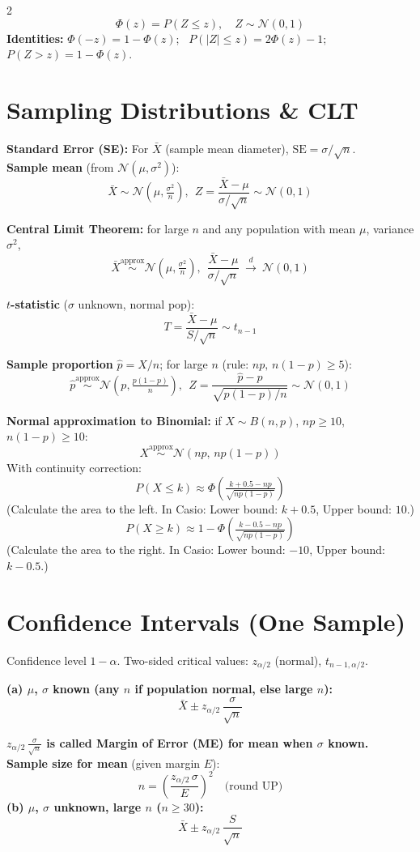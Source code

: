 \documentclass[9pt,a4paper]{extarticle}
\newcommand{\sh}[1]{\textbf{\color{BrickRed} #1}}
\begin{document}
\begin{multicols*}{2}
\[
\Phi(z) = P(Z \le z), \quad Z \sim \mathcal{N}(0,1)
\]
\sh{Identities:} $\Phi(-z)=1-\Phi(z)$; \ $P(|Z|\le z)=2\Phi(z)-1$; \ $P(Z>z)=1-\Phi(z)$.

\section{Sampling Distributions \& CLT}
\sh{Standard Error (SE):} For $\bar{X}$ (sample mean diameter), $\text{SE} = \sigma/\sqrt{n}$.\\
\sh{Sample mean} (from $\mathcal{N}(\mu,\sigma^{2})$):
\[
\bar{X}\sim \mathcal{N}\!\left(\mu,\tfrac{\sigma^{2}}{n}\right),\ \
Z=\frac{\bar{X}-\mu}{\sigma/\sqrt{n}}\sim\mathcal{N}(0,1)
\]

\sh{Central Limit Theorem:} for large $n$ and any population with mean $\mu$, variance $\sigma^{2}$,
\[
\bar{X}\overset{\text{approx}}{\sim}\mathcal{N}\!\left(\mu,\tfrac{\sigma^{2}}{n}\right),\ \
\frac{\bar{X}-\mu}{\sigma/\sqrt{n}}\ \xrightarrow{d}\ \mathcal{N}(0,1)
\]

\sh{$t$-statistic} ($\sigma$ unknown, normal pop):
\[
T=\frac{\bar{X}-\mu}{S/\sqrt{n}}\sim t_{n-1}
\]

\sh{Sample proportion} $\hat{p}=X/n$; for large $n$ (rule: $np,\,n(1-p)\ge 5$):
\[
\hat{p}\overset{\text{approx}}{\sim}\mathcal{N}\!\left(p,\tfrac{p(1-p)}{n}\right),\ \
Z=\frac{\hat{p}-p}{\sqrt{p(1-p)/n}}\sim\mathcal{N}(0,1)
\]

\sh{Normal approximation to Binomial:} if $X\sim B(n,p)$, $np\ge 10$, $n(1-p)\ge 10$:
\[
X\overset{\text{approx}}{\sim}\mathcal{N}\!\left(np,\,np(1-p)\right)
\]
With continuity correction:
\[
P(X\le k)\approx \Phi\!\left(\tfrac{k+0.5-np}{\sqrt{np(1-p)}}\right)
\]
(Calculate the area to the left. In Casio: Lower bound: $k+0.5$, Upper bound: $10$.)\\
\[
P(X\ge k)\approx 1-\Phi\!\left(\tfrac{k-0.5-np}{\sqrt{np(1-p)}}\right)
\]
(Calculate the area to the right. In Casio: Lower bound: $-10$, Upper bound: $k-0.5$.)
\section{Confidence Intervals (One Sample)}

Confidence level $1-\alpha$. Two-sided critical values: $z_{\alpha/2}$ (normal), $t_{n-1,\alpha/2}$.

\sh{(a) $\mu$, $\sigma$ known (any $n$ if population normal, else large $n$):}
\[
\bar{X}\pm z_{\alpha/2}\,\frac{\sigma}{\sqrt{n}}
\]

\textbf{$z_{\alpha/2}\,\frac{\sigma}{\sqrt{n}}$ is called Margin of Error (ME) for mean when $\sigma$ known.}
\\
\sh{Sample size for mean} (given margin $E$):
\[
n=\left(\frac{z_{\alpha/2}\,\sigma}{E}\right)^{2}\quad\text{(round UP)}
\]
\sh{(b) $\mu$, $\sigma$ unknown, large $n$ ($n\ge 30$):}
\[
\bar{X}\pm z_{\alpha/2}\,\frac{S}{\sqrt{n}}
\]


\end{multicols*}
\end{document}
